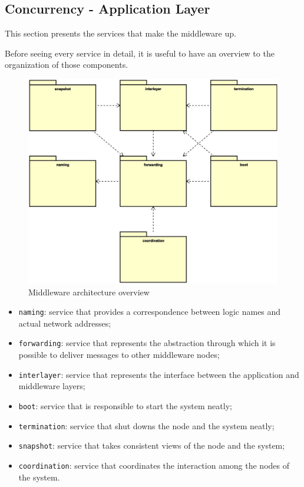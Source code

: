 \subsection{Concurrency - Application Layer}
This section presents the services that make the middleware up.

Before seeing every service in detail, it is useful to have an overview to the
organization of those components.

\begin{figure}[H]
  \centering
  \includegraphics[width=\columnwidth]{images/solution/mw/overview.eps}
  \caption{Middleware architecture overview}
  \label{fig:mw-arch-over}
\end{figure}

\begin{itemize}
  \item \texttt{naming}: service that provides a correspondence between logic
    names and actual network addresses;
  \item \texttt{forwarding}: service that represents the abstraction through
    which it is possible to deliver messages to other middleware nodes;
  \item \texttt{interlayer}: service that represents the interface between
    the application and middleware layers;
  \item \texttt{boot}: service that is responsible to start the system neatly;
  \item \texttt{termination}: service that shut downs the node and the system
    neatly;
  \item \texttt{snapshot}: service that takes consistent views of the node and
    the system;
  \item \texttt{coordination}: service that coordinates the interaction among
    the nodes of the system.
\end{itemize}
